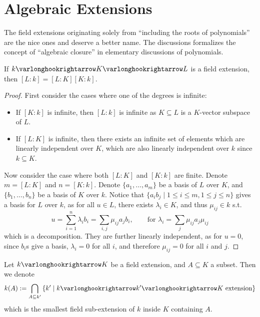 \section{Algebraic Extensions}

\textstart
The field extensions originating solely from ``including the roots of polynomials'' are the nice ones and deserve a better name. The discussions formalizes the concept of ``algebraic closure'' in elementary discussions of polynomials.

\begin{proposition}\label{prop: degree of composition of field extensions}
    If $k \ext K \ext L$ is a field extension, then $[L:k] = [L:K][K:k]$.
\end{proposition}

\begin{proof}
    First consider the cases where one of the degrees is infinite: 
    \begin{itemize}
        \item If $[K : k]$ is infinite, then $[L : k]$ is infinite as $K \subseteq L$ is a $K$-vector subspace of $L$. 
        \item If $[L : K]$ is infinite, then there exists an infinite set of elements which are linearly independent over $K$, which are also linearly independent over $k$ since $k \subseteq K$.
    \end{itemize}
    Now consider the case where both $[L:K]$ and $[K:k]$ are finite. Denote $m = [L:K]$ and $n = [K:k]$. Denote $\{a_1, \dots, a_m\}$ be a basis of $L$ over $K$, and $\{b_1, \dots, b_n\}$ be a basis of $K$ over $k$. Notice that $\{a_i b_j \mid 1 \leq i \leq m, 1 \leq j \leq n\}$ gives a basis for $L$ over $k$, as for all $u \in L$, there exists $\lambda_i \in K$, and thus $\mu_{ij} \in k$ s.t.
    \[
        u = \sum_{i = 1}^n \lambda_i b_i = \sum_{i, j} \mu_{ij} a_j b_i, \qquad \text{for $\lambda_i = \sum_{j} \mu_{ij} a_j \mu_{ij}$}
    \]
    which is a decomposition. They are further linearly independent, as for $u = 0$, since $b_i$s give a basis, $\lambda_i = 0$ for all $i$, and therefore $\mu_{ij} = 0$ for all $i$ and $j$.
\end{proof}

\begin{notation}\label{not: extending field by field}
    Let $k \ext K$ be a field extension, and $A \subseteq K$ a subset. Then we denote
    \[
        k(A) := \bigcap_{A \subseteq k'} \left\{ k' \mid k \ext k' \ext K \text{ extension} \right\}
    \]
    which is the smallest field sub-extension of $k$ inside $K$ containing $A$. 
\end{notation}

